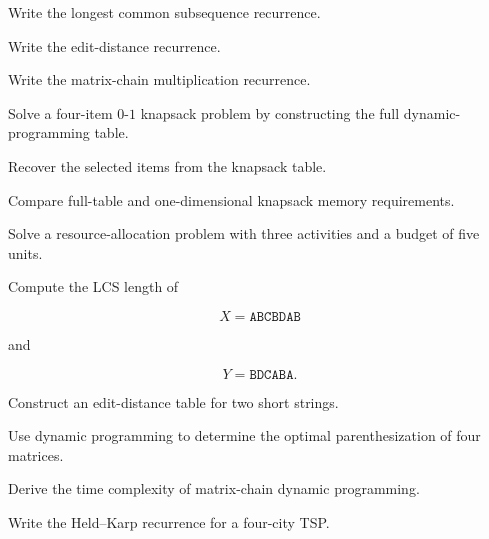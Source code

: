\begin{exercise}[2]
Write the longest common subsequence recurrence.
\end{exercise}

\begin{exercise}[2]
Write the edit-distance recurrence.
\end{exercise}

\begin{exercise}[2]
Write the matrix-chain multiplication recurrence.
\end{exercise}

\begin{exercise}[3]
Solve a four-item \(0\)-\(1\) knapsack problem by constructing the full
dynamic-programming table.
\end{exercise}

\begin{exercise}[3]
Recover the selected items from the knapsack table.
\end{exercise}

\begin{exercise}[3]
Compare full-table and one-dimensional knapsack memory requirements.
\end{exercise}

\begin{exercise}[3]
Solve a resource-allocation problem with three activities and a budget of
five units.
\end{exercise}

\begin{exercise}[3]
Compute the LCS length of

\[
X=\texttt{ABCBDAB}
\]

and

\[
Y=\texttt{BDCABA}.
\]
\end{exercise}

\begin{exercise}[3]
Construct an edit-distance table for two short strings.
\end{exercise}

\begin{exercise}[3]
Use dynamic programming to determine the optimal parenthesization of four
matrices.
\end{exercise}

\begin{exercise}[3]
Derive the time complexity of matrix-chain dynamic programming.
\end{exercise}

\begin{exercise}[3]
Write the Held--Karp recurrence for a four-city TSP.
\end{exercise}

